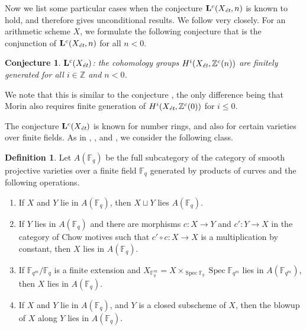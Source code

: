 \documentclass[leqno,12pt]{article}
\theoremstyle{plain}
\newtheorem{conjecture}[theorem]{\indent\sc Conjecture}
\theoremstyle{definition}
\newtheorem{definition}[theorem]{\indent\sc Definition}
\DeclareMathOperator{\Spec}{Spec}
\newcommand{\FF}{\mathbb{F}}
\newcommand{\ZZ}{\mathbb{Z}}
\newcommand{\et}{\text{\it \'{e}t}}
\begin{document}
Now we list some particular cases when the conjecture $\mathbf{L}^c (X_\et,n)$
is known to hold, and therefore gives unconditional results. We follow
\cite[\S 5]{Morin-2014} very closely. For an arithmetic scheme $X$, we formulate
the following conjecture that is the conjunction of $\mathbf{L}^c (X_\et,n)$ for
all $n < 0$.

\begin{conjecture}
  $\mathbf{L}^c (X_\et)$: the cohomology groups $H^i (X_\et, \ZZ^c (n))$ are
  finitely generated for all $i \in \ZZ$ and $n < 0$.
\end{conjecture}

We note that this is similar to the conjecture
\cite[Definition~5.8]{Morin-2014}, the only difference being that Morin also
requires finite generation of $H^i (X_\et, \ZZ^c (0))$ for $i \le 0$.

The conjecture $\mathbf{L}^c (X_\et)$ is known for number rings, and also for
certain varieties over finite fields. As in \cite{Soule-1984},
\cite{Geisser-2004}, and \cite{Morin-2014}, we consider the following class.

\begin{definition}
  Let $A (\FF_q)$ be the full subcategory of the category of smooth projective
  varieties over a finite field $\FF_q$ generated by products of curves and the
  following operations.
  \begin{enumerate}
  \item[1)] If $X$ and $Y$ lie in $A (\FF_q)$, then $X \sqcup Y$ lies
    $A (\FF_q)$.
  \item[2)] If $Y$ lies in $A (\FF_q)$ and there are morphisms $c\colon X\to Y$
    and $c'\colon Y\to X$ in the category of Chow motives such that
    $c'\circ c\colon X\to X$ is a multiplication by constant, then
    $X$ lies in $A (\FF_q)$.
  \item[3)] If $\FF_{q^m}/\FF_q$ is a finite extension and
    $X_{\FF_q^m} = X \times_{\Spec \FF_q} \Spec \FF_{q^m}$ lies in
    $A (\FF_{q^m})$, then $X$ lies in $A (\FF_q)$.
  \item[4)] If $X$ and $Y$ lie in $A (\FF_q)$, and $Y$ is a closed subscheme of
    $X$, then the blowup of $X$ along $Y$ lies in $A (\FF_q)$.
  \end{enumerate}
\end{definition}
\end{document}
